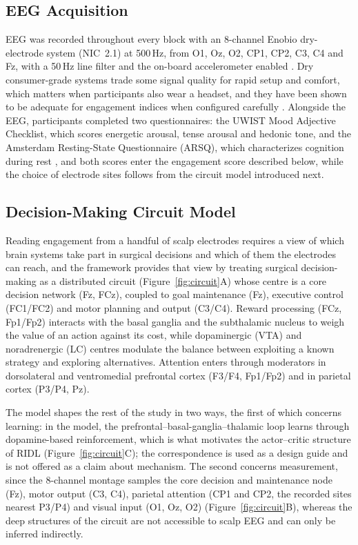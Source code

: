\documentclass[utf8]{frontiers_suppmat}
\begin{document}
\subsection{EEG Acquisition}
EEG was recorded throughout every block with an 8-channel Enobio dry-electrode system (NIC~2.1) at 500\,Hz, from O1, Oz, O2, CP1, CP2, C3, C4 and Fz, with a 50\,Hz line filter and the on-board accelerometer enabled \cite{Duvinage2013Performance,Qiu2019Assessing}. Dry consumer-grade systems trade some signal quality for rapid setup and comfort, which matters when participants also wear a headset, and they have been shown to be adequate for engagement indices when configured carefully \cite{Frey2016Comparison,Han2018Interactive}. Alongside the EEG, participants completed two questionnaires: the UWIST Mood Adjective Checklist, which scores energetic arousal, tense arousal and hedonic tone, and the Amsterdam Resting-State Questionnaire (ARSQ), which characterizes cognition during rest \cite{10.3389/fnrgo.2022.1052411}, and both scores enter the engagement score described below, while the choice of electrode sites follows from the circuit model introduced next.

\subsection{Decision-Making Circuit Model}
Reading engagement from a handful of scalp electrodes requires a view of which brain systems take part in surgical decisions and which of them the electrodes can reach, and the framework provides that view by treating surgical decision-making as a distributed circuit (Figure~\ref{fig:circuit}A) whose centre is a core decision network (Fz, FCz), coupled to goal maintenance (Fz), executive control (FC1/FC2) and motor planning and output (C3/C4). Reward processing (FCz, Fp1/Fp2) interacts with the basal ganglia and the subthalamic nucleus to weigh the value of an action against its cost, while dopaminergic (VTA) and noradrenergic (LC) centres modulate the balance between exploiting a known strategy and exploring alternatives. Attention enters through moderators in dorsolateral and ventromedial prefrontal cortex (F3/F4, Fp1/Fp2) and in parietal cortex (P3/P4, Pz).

The model shapes the rest of the study in two ways, the first of which concerns learning: in the model, the prefrontal--basal-ganglia--thalamic loop learns through dopamine-based reinforcement, which is what motivates the actor--critic structure of RIDL (Figure~\ref{fig:circuit}C); the correspondence is used as a design guide and is not offered as a claim about mechanism. The second concerns measurement, since the 8-channel montage samples the core decision and maintenance node (Fz), motor output (C3, C4), parietal attention (CP1 and CP2, the recorded sites nearest P3/P4) and visual input (O1, Oz, O2) (Figure~\ref{fig:circuit}B), whereas the deep structures of the circuit are not accessible to scalp EEG and can only be inferred indirectly.
\end{document}
